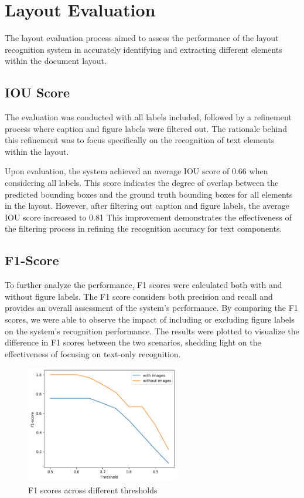 \section{Layout Evaluation}
The layout evaluation process aimed to assess the performance of the layout recognition system in accurately identifying and extracting different elements within the document layout.
\subsection{IOU Score}
The evaluation was conducted with all labels included, followed by a refinement process where caption and figure labels were filtered out. The rationale behind this refinement was to focus specifically on the recognition of text elements within the layout.

Upon evaluation, the system achieved an average IOU score of 0.66 when considering all labels. This score indicates the degree of overlap between the predicted bounding boxes and the ground truth bounding boxes for all elements in the layout. However, after filtering out caption and figure labels, the average IOU score increased to 0.81 This improvement demonstrates the effectiveness of the filtering process in refining the recognition accuracy for text components.

\subsection{F1-Score}
To further analyze the performance, F1 scores were calculated both with and without figure labels. The F1 score considers both precision and recall and provides an overall assessment of the system's performance. By comparing the F1 scores, we were able to observe the impact of including or excluding figure labels on the system's recognition performance. The results were plotted to visualize the difference in F1 scores between the two scenarios, shedding light on the effectiveness of focusing on text-only recognition.

\begin{figure}[H]
    \centering
    \includegraphics[width=0.6\textwidth]{Images/f1s.png}
    \caption{F1 scores across different thresholds}
    \label{fig:f1}
\end{figure}

